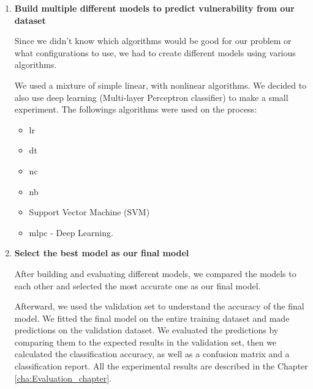 \begin{enumerate}
\newpage

\item \textbf{Build multiple different models to predict vulnerability from our dataset}

Since we didn't know which algorithms would be good for our problem or what configurations to use, we had to create different models using various algorithms.

We used a mixture of simple linear, with nonlinear algorithms. We decided to also use deep learning (Multi-layer Perceptron classifier) to make a small experiment. The followings algorithms were used on the process:
\begin{itemize}
    \item \gls{lr}
    \item \gls{dt}
    \item \gls{nc}
    \item \gls{nb}
    \item Support Vector Machine (SVM)
    \item \gls{mlpc} - Deep Learning.
\end{itemize}

\item \textbf{Select the best model as our final model}

After building and evaluating different models, we compared the models to each other and selected the most accurate one as our final model.

Afterward, we used the validation set to understand the accuracy of the final model. We fitted the final model on the entire training dataset and made predictions on the validation dataset. We evaluated the predictions by comparing them to the expected results in the validation set, then we calculated the classification accuracy, as well as a confusion matrix and a classification report. All the experimental results are described in the Chapter \ref{cha:Evaluation_chapter}.
\end{enumerate}

